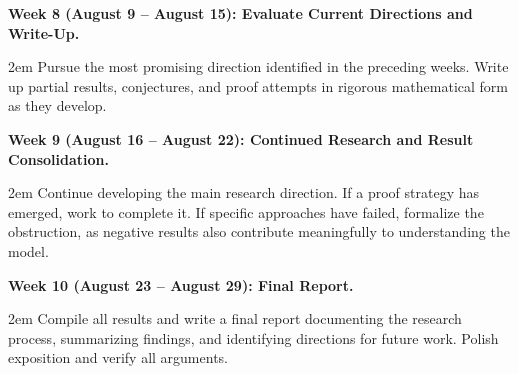 \documentclass[12pt]{article}
\begin{document}
\textbf{Week 8 (August 9 -- August 15): Evaluate Current Directions 
and Write-Up.}

    \begin{adjustwidth}{2em}{}
         Pursue the most promising direction identified in the preceding weeks. Write up partial results, conjectures, and proof attempts in rigorous mathematical form as they develop.
    \end{adjustwidth}

\textbf{Week 9 (August 16 -- August 22): Continued Research and 
Result Consolidation.}

    \begin{adjustwidth}{2em}{}
        Continue developing the main research direction. If a proof strategy has emerged, work to complete it. If specific approaches have failed, formalize the obstruction, as negative results also contribute meaningfully to understanding the model.
    \end{adjustwidth}

\textbf{Week 10 (August 23 -- August 29): Final Report.}

    \begin{adjustwidth}{2em}{}
        Compile all results and write a final report documenting the research process, summarizing findings, and identifying directions for future work. Polish exposition and verify all arguments.
    \end{adjustwidth}
    
\end{document}
